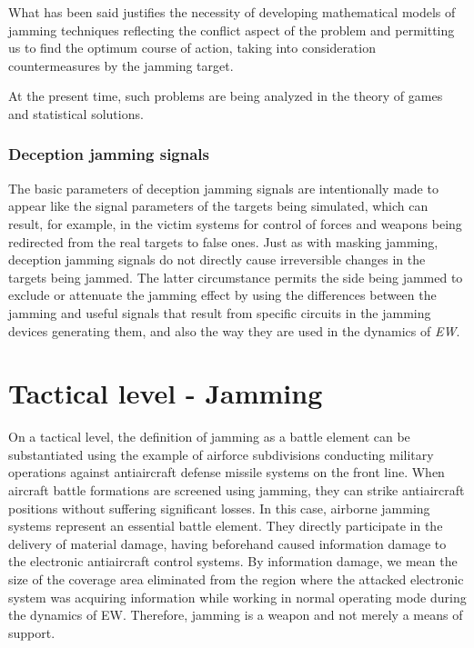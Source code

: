 \documentclass[english,purist]{ist-report}
\begin{document}
What has been said justifies the necessity of developing mathematical models of jamming techniques reflecting the conflict aspect of the problem and permitting us to find the optimum course of action, taking into consideration countermeasures by the jamming target.

At the present time, such problems are being analyzed in the theory of
games and statistical solutions. 



\subsubsection{Deception jamming signals}
The basic parameters of deception jamming signals are intentionally
made to appear like the signal parameters of the targets being simulated, which can result, for example, in the victim systems for control of forces and weapons being redirected from the real targets to false ones. Just as with masking jamming, deception jamming signals do not directly cause irreversible changes in the targets being jammed. The latter circumstance permits the side being jammed to exclude or attenuate the jamming effect by using the differences between the jamming and useful signals that result from specific circuits in the jamming devices generating them, and also the way they are used in the dynamics of \textit{EW}.


\section{Tactical level - Jamming}

On a tactical level, the definition of jamming as a battle element can be substantiated using the example of airforce subdivisions conducting military operations against antiaircraft defense missile systems on the front line. When aircraft battle formations are screened using jamming, they can strike antiaircraft positions without suffering significant losses. In this case, airborne jamming systems represent an essential battle element. They directly participate in the delivery of material damage, having beforehand caused information damage to the electronic antiaircraft control systems.
By information damage, we mean the size of the coverage area eliminated from the region where the attacked electronic system was acquiring information while working in normal operating mode during the dynamics of EW. Therefore, jamming is a weapon and not merely a
means of support. 
\end{document}
